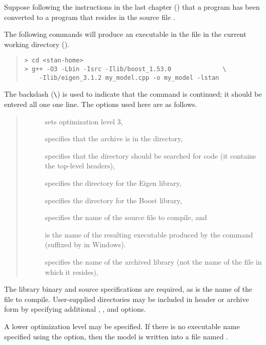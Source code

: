 Suppose following the instructions in the last chapter
() that a \Stan program has been converted to a \Cpp
program that resides in the source file .

The following commands will produce an executable in the file
 in the current working directory ().
%
\begin{quote}
\begin{Verbatim}[fontshape=sl]
> cd <stan-home>
> g++ -O3 -Lbin -Isrc -Ilib/boost_1.53.0              \
    -Ilib/eigen_3.1.2 my_model.cpp -o my_model -lstan
\end{Verbatim}
\end{quote} %
The backslash (\Verb|\|) is used to indicate that the command is
continued; it should be entered all one one line.
%
The options used here are as follows.
\begin{quote}
\begin{description}
\item[] sets optimization level 3,
\item[] specifies that the archive is in the 
  directory,
\item[] specifies that the directory  should be
  searched for code (it contains the top-level \Stan headers),
\item[] specifies the directory for
  the Eigen library,
\item[] specifies the directory for the 
  Boost library,
\item[] specifies the name of the source file to
  compile, and 
\item[] is the name of the resulting executable
  produced by the command (suffixed by \code{.exe} in Windows).
\item[] specifies the name of the archived library (not
  the name of the file in which it resides),
\end{description}
\end{quote}
%
The library binary and source specifications are required, as is the
name of the \Cpp file to compile.  User-supplied directories may be
included in header or archive form by specifying additional ,
\code{-l}, and \code{-I} options.
 
A lower optimization level may be specified.  If there is no
executable name specified using the  option, then the model
is written into a file named \code{a.out}.
 

